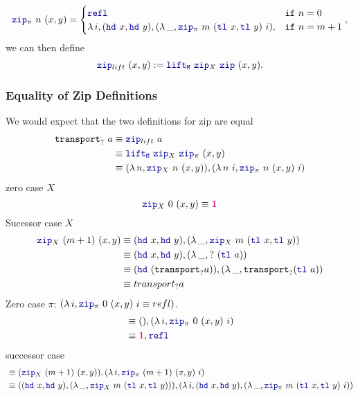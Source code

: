 \documentclass[twoside,11pt,openright]{report}
\newcommand*{\type}[1]{\textcolor{magenta!90!black}{#1}}
\newcommand*{\unit}{\type{\textbf{1}}}
\newcommand*{\function}[1]{\textcolor{blue!60!black}{\ensuremath{\mathtt{#1}}}}
\begin{document}
\begin{equation}
  \function{zip}_{\pi}~n~(x , y) = \begin{cases} \function{refl} & \mathtt{if}~n = 0 \\ \lambda\,i,(\function{hd}~x , \function{hd}~y) , (\lambda\,\_, \function{zip}_{\pi}~m~(\function{tl}~x,\function{tl}~y)~i) , & \mathtt{if}~n = m + 1 \end{cases},
\end{equation}
we can then define
\begin{equation}
  \function{zip}_{lift}~(x , y) := \function{lift_M}~\function{zip}_X~\function{zip}~(x,y).
\end{equation}
\subsubsection{Equality of Zip Definitions}
We would expect that the two definitions for zip are equal
\begin{align}
  \texttt{transport}_{?}~a &\equiv \function{zip}_{lift}~a \\
                           &\equiv \function{lift_M}~\function{zip}_X~\function{zip}_\pi~(x,y) \\
                           &\equiv (\lambda\,n, \function{zip}_X~n~(x,y)) , (\lambda\,n~i, \function{zip}_\pi~n~(x,y)~i)
\end{align}
zero case \(X\)
\begin{equation}
  \function{zip}_X~0~(x,y) \equiv \unit
\end{equation}
Sucessor case \(X\)
\begin{align} 
  \function{zip}_X~(m+1)~(x,y) &\equiv (\function{hd}~x, \function{hd}~y),(\lambda\,\_,\function{zip}_X~m~(\function{tl}~x,\function{tl}~y)) \\
   &\equiv (\function{hd}~x, \function{hd}~y),(\lambda\,\_, {?}~(\function{tl}~a)) \\
   &\equiv (\function{hd}~(\texttt{transport}_{?} a)),(\lambda\,\_, \texttt{transport}_{?} (\function{tl}~a)) \\
   &\equiv transport_? a \\
\end{align}
Zero case \(\pi\): \((\lambda\,i, \function{zip}_\pi~0~(x,y)~i \equiv refl)\).
\begin{align}
  &\equiv () , (\lambda\,i, \function{zip}_\pi~0~(x,y)~i) \\
  &\equiv \unit , \function{refl} \\
\end{align}
successor case
\begin{align}
  &\equiv (\function{zip}_X~(m+1)~(x,y)) , (\lambda\,i, \function{zip}_\pi~(m+1)~(x,y)~i) \\
  &\equiv ((\function{hd}~x, \function{hd}~y),(\lambda\,\_,\function{zip}_X~m~(\function{tl}~x,\function{tl}~y))) , (\lambda\,i, (\function{hd}~x, \function{hd}~y),(\lambda\,\_,\function{zip}_\pi~m~(\function{tl}~x,\function{tl}~y)~i))
\end{align}
\end{document}
